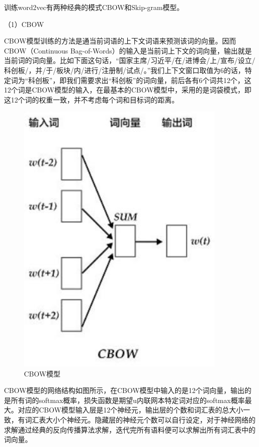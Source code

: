 \documentclass[winfonts,master,oneside,nobackinfo]{njuthesis}
\begin{document}
训练word2vec有两种经典的模式CBOW和Skip-gram模型。

（1）CBOW

CBOW模型训练的方法是通当前词语的上下文词语来预测该词的向量。因而CBOW（Continuous Bag-of-Words）的输入是当前词上下文的词向量，输出就是当前词的词向量。比如下面这句话，“国家主席/习近平/在/进博会/上/宣布/设立/科创板/，并/于/板块/内/进行/注册制/试点/。”我们上下文窗口取值为6的话，特定词为“科创板”，即我们需要求出“科创板”的词向量，前后各有6个词共12个，这12个词是CBOW模型的输入，在最基本的CBOW模型中，采用的是词袋模式，即这12个词的权重一致，并不考虑每个词和目标词的距离。

\begin{figure}[h]
\centering
\begin{minipage}[t]{0.5\textwidth}
\includegraphics[width=0.9\textwidth]{./figure/CBOW模型.jpg}
\caption{CBOW模型}
\label{lab:1}
\end{minipage}
\end{figure}

CBOW模型的网络结构如图所示，在CBOW模型中输入的是12个词向量，输出的是所有词的softmax概率，损失函数是期望u内联网本特定词对应的softmax概率最大。对应的CBOW模型输入层是12个神经元，输出层的个数和词汇表的总大小一致，有词汇表大小个神经元。隐藏层的神经元个数可以自行设定，对于神经网络的求解通过经典的反向传播算法求解，迭代完所有语料便可以求解出所有词汇表中的词向量。
\end{document}
